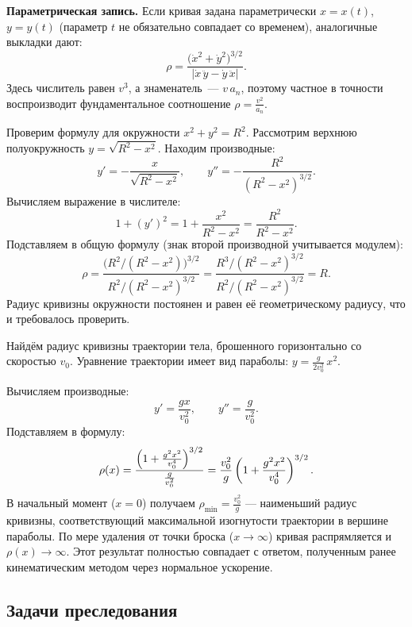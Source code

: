 \documentclass[../main.tex]{subfiles}
\begin{document}
\noindent\textbf{Параметрическая запись.}
Если кривая задана параметрически $x = x(t)$, $y = y(t)$ (параметр $t$
не обязательно совпадает со временем), аналогичные выкладки дают:
\[
    \rho = \frac{\bigl(\dot x^2 + \dot y^2\bigr)^{3/2}}{|\dot x\,\ddot y - \dot y\,\ddot x|}.
\]
Здесь числитель равен $v^3$, а знаменатель~--- $v\,a_n$, поэтому частное
в точности воспроизводит фундаментальное соотношение $\rho = \frac{v^2}{a_n}$.

\begin{example}
Проверим формулу для окружности $x^2 + y^2 = R^2$.
Рассмотрим верхнюю полуокружность $y = \sqrt{R^2 - x^2}$. Находим производные:
\[
    y' = -\frac{x}{\sqrt{R^2 - x^2}},
    \qquad
    y'' = -\frac{R^2}{(R^2 - x^2)^{3/2}}.
\]
Вычисляем выражение в числителе:
\[
    1 + (y')^2 = 1 + \frac{x^2}{R^2 - x^2} = \frac{R^2}{R^2 - x^2}.
\]
Подставляем в общую формулу (знак второй производной учитывается модулем):
\[
    \rho = \frac{\bigl(R^2/(R^2-x^2)\bigr)^{3/2}}{R^2/(R^2-x^2)^{3/2}}
         = \frac{R^3/(R^2-x^2)^{3/2}}{R^2/(R^2-x^2)^{3/2}} = R.
\]
Радиус кривизны окружности постоянен и равен её геометрическому радиусу,
что и требовалось проверить.
\end{example}

\begin{example}
Найдём радиус кривизны траектории тела, брошенного горизонтально со
скоростью $v_0$. Уравнение траектории имеет вид параболы:
$y = \frac{g}{2v_0^2}\,x^2$.

Вычисляем производные:
\[
    y' = \frac{gx}{v_0^2},
    \qquad
    y'' = \frac{g}{v_0^2}.
\]
Подставляем в формулу:
\[
    \rho(x) = \frac{\Bigl(1 + \frac{g^2x^2}{v_0^4}\Bigr)^{3/2}}{\frac{g}{v_0^2}}
            = \frac{v_0^2}{g}\left(1 + \frac{g^2x^2}{v_0^4}\right)^{3/2}.
\]
В начальный момент ($x = 0$) получаем $\rho_{\min} = \frac{v_0^2}{g}$ ---
наименьший радиус кривизны, соответствующий максимальной изогнутости
траектории в вершине параболы. По мере удаления от точки броска
($x \to \infty$) кривая распрямляется и $\rho(x) \to \infty$.
Этот результат полностью совпадает с ответом, полученным ранее
кинематическим методом через нормальное ускорение.
\end{example}

\subsection{Задачи преследования}
\end{document}
